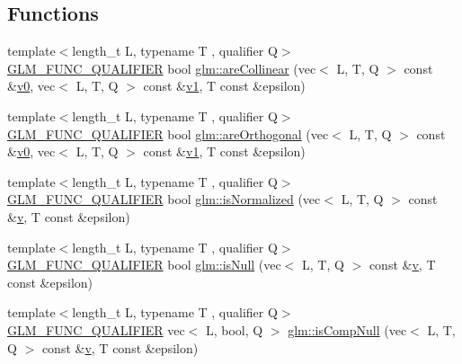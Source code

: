 \subsection*{Functions}
\begin{DoxyCompactItemize}
\item 
{\footnotesize template$<$length\+\_\+t L, typename T , qualifier Q$>$ }\\\mbox{\hyperlink{setup_8hpp_a33fdea6f91c5f834105f7415e2a64407}{G\+L\+M\+\_\+\+F\+U\+N\+C\+\_\+\+Q\+U\+A\+L\+I\+F\+I\+ER}} bool \mbox{\hyperlink{group__gtx__vector__query_ga13da4a787a2ff70e95d561fb19ff91b4}{glm\+::are\+Collinear}} (vec$<$ L, T, Q $>$ const \&\mbox{\hyperlink{_s_d_l__opengl__glext_8h_a7062a23d1d434121d4a88f530703d06a}{v0}}, vec$<$ L, T, Q $>$ const \&\mbox{\hyperlink{_s_d_l__opengl__glext_8h_a435c176a02c061b43e19bdf7c86cceae}{v1}}, T const \&epsilon)
\item 
{\footnotesize template$<$length\+\_\+t L, typename T , qualifier Q$>$ }\\\mbox{\hyperlink{setup_8hpp_a33fdea6f91c5f834105f7415e2a64407}{G\+L\+M\+\_\+\+F\+U\+N\+C\+\_\+\+Q\+U\+A\+L\+I\+F\+I\+ER}} bool \mbox{\hyperlink{group__gtx__vector__query_gac7b95b3f798e3c293262b2bdaad47c57}{glm\+::are\+Orthogonal}} (vec$<$ L, T, Q $>$ const \&\mbox{\hyperlink{_s_d_l__opengl__glext_8h_a7062a23d1d434121d4a88f530703d06a}{v0}}, vec$<$ L, T, Q $>$ const \&\mbox{\hyperlink{_s_d_l__opengl__glext_8h_a435c176a02c061b43e19bdf7c86cceae}{v1}}, T const \&epsilon)
\item 
{\footnotesize template$<$length\+\_\+t L, typename T , qualifier Q$>$ }\\\mbox{\hyperlink{setup_8hpp_a33fdea6f91c5f834105f7415e2a64407}{G\+L\+M\+\_\+\+F\+U\+N\+C\+\_\+\+Q\+U\+A\+L\+I\+F\+I\+ER}} bool \mbox{\hyperlink{group__gtx__vector__query_gac3c974f459fd75453134fad7ae89a39e}{glm\+::is\+Normalized}} (vec$<$ L, T, Q $>$ const \&\mbox{\hyperlink{_s_d_l__opengl_8h_a10a82eabcb59d2fcd74acee063775f90}{v}}, T const \&epsilon)
\item 
{\footnotesize template$<$length\+\_\+t L, typename T , qualifier Q$>$ }\\\mbox{\hyperlink{setup_8hpp_a33fdea6f91c5f834105f7415e2a64407}{G\+L\+M\+\_\+\+F\+U\+N\+C\+\_\+\+Q\+U\+A\+L\+I\+F\+I\+ER}} bool \mbox{\hyperlink{group__gtx__vector__query_gab4a3637dbcb4bb42dc55caea7a1e0495}{glm\+::is\+Null}} (vec$<$ L, T, Q $>$ const \&\mbox{\hyperlink{_s_d_l__opengl_8h_a10a82eabcb59d2fcd74acee063775f90}{v}}, T const \&epsilon)
\item 
{\footnotesize template$<$length\+\_\+t L, typename T , qualifier Q$>$ }\\\mbox{\hyperlink{setup_8hpp_a33fdea6f91c5f834105f7415e2a64407}{G\+L\+M\+\_\+\+F\+U\+N\+C\+\_\+\+Q\+U\+A\+L\+I\+F\+I\+ER}} vec$<$ L, bool, Q $>$ \mbox{\hyperlink{group__gtx__vector__query_gaf6ec1688eab7442fe96fe4941d5d4e76}{glm\+::is\+Comp\+Null}} (vec$<$ L, T, Q $>$ const \&\mbox{\hyperlink{_s_d_l__opengl_8h_a10a82eabcb59d2fcd74acee063775f90}{v}}, T const \&epsilon)

\end{DoxyCompactItemize}
